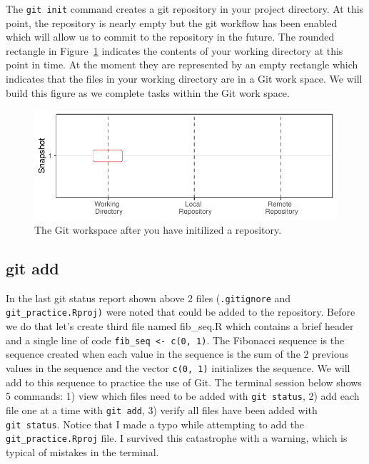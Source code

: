 \documentclass[
  letterpaper,
  DIV=11,
  numbers=noendperiod]{scrreprt}
\begin{document}
The \texttt{git\ init} command creates a git repository in your project
directory. At this point, the repository is nearly empty but the git
workflow has been enabled which will allow us to commit to the
repository in the future. The rounded rectangle in Figure~\ref{fig-init}
indicates the contents of your working directory at this point in time.
At the moment they are represented by an empty rectangle which indicates
that the files in your working directory are in a Git work space. We
will build this figure as we complete tasks within the Git work space.

\begin{figure}

{\centering \includegraphics{basics_files/figure-pdf/fig-init-1.pdf}

}

\caption{\label{fig-init}The Git workspace after you have initilized a
repository.}

\end{figure}

\hypertarget{git-add}{%
\subsection{git add}\label{git-add}}

In the last git status report shown above 2 files (\texttt{.gitignore}
and \texttt{git\_practice.Rproj)} were noted that could be added to the
repository. Before we do that let's create third file named fib\_seq.R
which contains a brief header and a single line of code
\texttt{fib\_seq\ \textless{}-\ c(0,\ 1)}. The Fibonacci sequence is the
sequence created when each value in the sequence is the sum of the 2
previous values in the sequence and the vector \texttt{c(0,\ 1)}
initializes the sequence. We will add to this sequence to practice the
use of Git. The terminal session below shows 5 commands: 1) view which
files need to be added with \texttt{git\ status}, 2) add each file one
at a time with \texttt{git\ add}, 3) verify all files have been added
with \texttt{git\ status}. Notice that I made a typo while attempting to
add the \texttt{git\_practice.Rproj} file. I survived this catastrophe
with a warning, which is typical of mistakes in the terminal.
\end{document}
